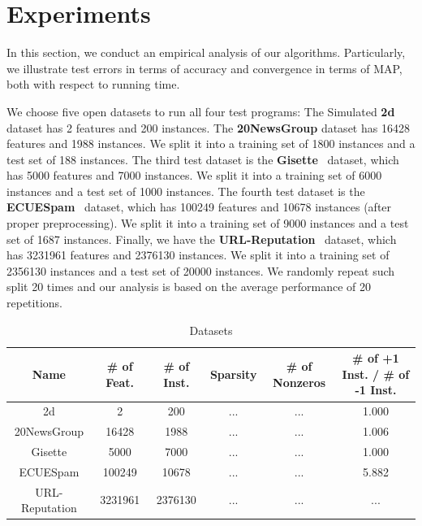 \documentclass{llncs}
\begin{document}
\section{Experiments} \label{sec:experiment}
In this section, we conduct an empirical analysis of our algorithms.
Particularly, we illustrate test errors in terms of accuracy and convergence in terms of MAP, both with respect to running time.

We choose five open datasets to run all four test programs:	
The	Simulated \textbf{2d} dataset has 2 features and 200 instances.
The	\textbf{20NewsGroup} dataset has 16428 features and 1988 instances. We split it into a training set of 1800 instances and a test set of 188 instances.	
The	third test dataset is the \textbf{Gisette}~\cite{guyon2004result} dataset, which has 5000 features and 7000 instances. We split it into a training set of 6000 instances and a test set of 1000 instances.
The	fourth test dataset is the \textbf{ECUESpam}~\cite{DelanyKBS05} dataset, which has 100249 features and 10678 instances (after proper preprocessing). We split it into a training set of 9000 instances and a test set of 1687 instances.
Finally, we have the \textbf{URL-Reputation}~\cite{ma2009identifying} dataset, which has 3231961 features and 2376130 instances. We split it into a training set of 2356130 instances and a test set of 20000 instances.
We randomly repeat such split 20 times and our analysis is based on the average performance of 20 repetitions.

\begin{table}[h]
\centering
\caption{Datasets}\label{tab:table1}
\begin{tabular}{|c|c|c|c|c|c|}
\hline
    Name           & \# of Feat. & \# of Inst. & Sparsity & \# of Nonzeros & \# of +1 Inst. / \# of -1 Inst.\\
\hline
    2d             & 2             & 200            & ...      & ...                 & 1.000 \\
\hline
    20NewsGroup    & 16428         & 1988           & ...      & ...                 & 1.006 \\
\hline
    Gisette        & 5000          & 7000           & ...      & ...                 & 1.000 \\
\hline
    ECUESpam       & 100249        & 10678          & ...      & ...                 & 5.882 \\
\hline
    URL-Reputation & 3231961       & 2376130        & ...      & ...                 & ... \\
\hline
\end{tabular}
\end{table}
\end{document}
